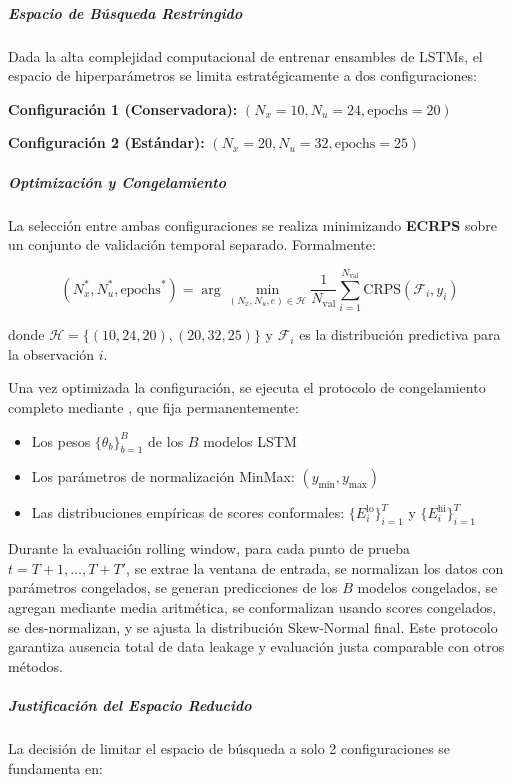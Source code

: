 \subparagraph{Espacio de Búsqueda Restringido}

Dada la alta complejidad computacional de entrenar ensambles de LSTMs, el espacio de hiperparámetros se limita estratégicamente a dos configuraciones:

\textbf{Configuración 1 (Conservadora):} $(N_x=10, N_u=24, \text{epochs}=20)$


\textbf{Configuración 2 (Estándar):} $(N_x=20, N_u=32, \text{epochs}=25)$


\subparagraph{Optimización y Congelamiento}

La selección entre ambas configuraciones se realiza minimizando \textbf{ECRPS} sobre un conjunto de validación temporal separado. Formalmente:

\begin{equation}
(N_x^*, N_u^*, \text{epochs}^*) = \arg\min_{(N_x, N_u, e) \in \mathcal{H}} \frac{1}{N_{\text{val}}} \sum_{i=1}^{N_{\text{val}}} \text{CRPS}(\mathcal{F}_i, y_i)
\end{equation}

donde $\mathcal{H} = \{(10, 24, 20), (20, 32, 25)\}$ y $\mathcal{F}_i$ es la distribución predictiva para la observación $i$.

Una vez optimizada la configuración, se ejecuta el protocolo de congelamiento completo mediante , que fija permanentemente:

\begin{itemize}
\item Los pesos $\{\theta_b\}_{b=1}^{B}$ de los $B$ modelos LSTM
\item Los parámetros de normalización MinMax: $(y_{\min}, y_{\max})$
\item Las distribuciones empíricas de scores conformales: $\{E_i^{\text{lo}}\}_{i=1}^{T}$ y $\{E_i^{\text{hi}}\}_{i=1}^{T}$
\end{itemize}

Durante la evaluación rolling window, para cada punto de prueba $t = T+1, \ldots, T+T'$, se extrae la ventana de entrada, se normalizan los datos con parámetros congelados, se generan predicciones de los $B$ modelos congelados, se agregan mediante media aritmética, se conformalizan usando scores congelados, se des-normalizan, y se ajusta la distribución Skew-Normal final. Este protocolo garantiza ausencia total de data leakage y evaluación justa comparable con otros métodos.

\subparagraph{Justificación del Espacio Reducido}

La decisión de limitar el espacio de búsqueda a solo 2 configuraciones se fundamenta en:

